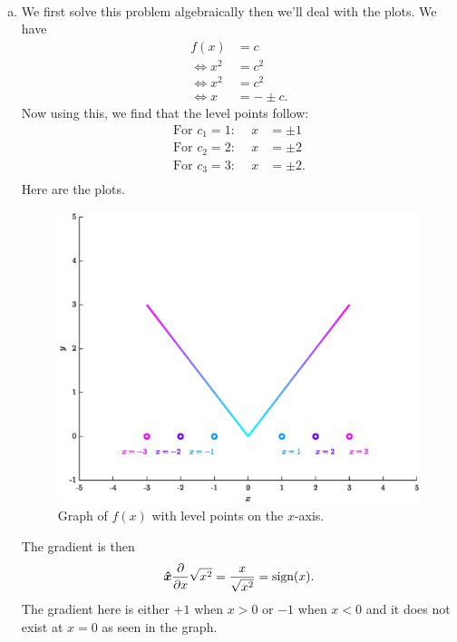 \documentclass[12pt]{article} %
\begin{document}
\begin{solution}~
\begin{enumerate}[(a)]
    \item We first solve this problem algebraically then we'll deal with the plots.  We have
    \begin{align*}
        f(x)&=c\\
        \iff x^2 &= c^2\\
        \iff x^2&= c^2\\
        \iff x &= -\pm c.
    \end{align*}
    Now using this, we find that the level points follow:
    \begin{align*}
        \textrm{For $c_1=1$:~}\quad x&=\pm 1\\
        \textrm{For $c_2=2$:~}\quad x&=\pm 2\\
        \textrm{For $c_3=3$:~}\quad x&=\pm 2.\\
    \end{align*}
    Here are the plots.
    \begin{figure}[H]
        \centering
        \includegraphics[width=.6\textwidth]{figures/7a}
        \caption{Graph of $f(x)$ with level points on the $x$-axis.}
    \end{figure}

    The gradient is then
    \[
    \boldsymbol{\hat{x}} \frac{\partial}{\partial x} \sqrt{x^2} = \frac{x}{\sqrt{x^2}} = \textrm{sign}(x).
    \]
    The gradient here is either $+1$ when $x>0$ or $-1$ when $x<0$ and it does not exist at $x=0$ as seen in the graph.


\end{enumerate}
\end{solution}
\end{document}
